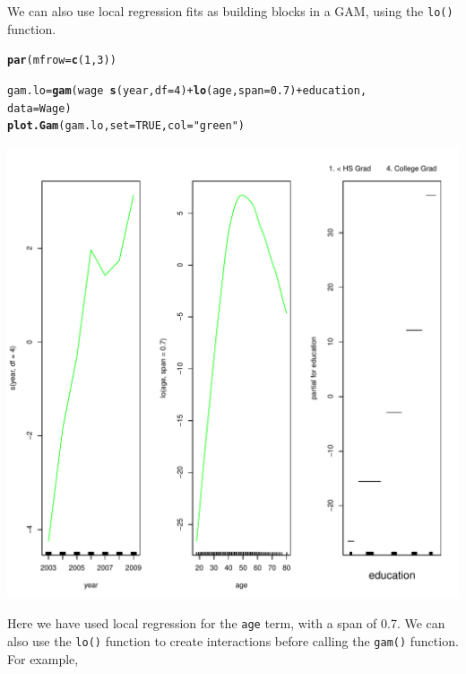 \documentclass[12pt]{article}\usepackage[]{graphicx}\usepackage[]{color}
\makeatletter
\def\maxwidth{ %
  \ifdim\Gin@nat@width>\linewidth
    \linewidth
  \else
    \Gin@nat@width
  \fi
}
\newcommand{\hlnum}[1]{\textcolor[rgb]{0.686,0.059,0.569}{#1}}%
\newcommand{\hlstr}[1]{\textcolor[rgb]{0.192,0.494,0.8}{#1}}%
\newcommand{\hlopt}[1]{\textcolor[rgb]{0,0,0}{#1}}%
\newcommand{\hlstd}[1]{\textcolor[rgb]{0.345,0.345,0.345}{#1}}%
\newcommand{\hlkwb}[1]{\textcolor[rgb]{0.69,0.353,0.396}{#1}}%
\newcommand{\hlkwc}[1]{\textcolor[rgb]{0.333,0.667,0.333}{#1}}%
\newcommand{\hlkwd}[1]{\textcolor[rgb]{0.737,0.353,0.396}{\textbf{#1}}}%
\newenvironment{kframe}{%
 \def\at@end@of@kframe{}%
 \ifinner\ifhmode%
  \def\at@end@of@kframe{\end{minipage}}%
  \begin{minipage}{\columnwidth}%
 \fi\fi%
 \def\FrameCommand##1{\hskip\@totalleftmargin \hskip-\fboxsep
 \colorbox{shadecolor}{##1}\hskip-\fboxsep
     \hskip-\linewidth \hskip-\@totalleftmargin \hskip\columnwidth}%
 \MakeFramed {\advance\hsize-\width
   \@totalleftmargin\z@ \linewidth\hsize
   \@setminipage}}%
 {\par\unskip\endMakeFramed%
 \at@end@of@kframe}
\newenvironment{knitrout}{}{} %
\makeatother
\begin{document}
We can also use local regression fits as building blocks in a GAM, using the \texttt{lo()} function.

\begin{knitrout}
\color{fgcolor}\begin{kframe}
\begin{alltt}
\hlkwd{par}\hlstd{(}\hlkwc{mfrow}\hlstd{=}\hlkwd{c}\hlstd{(}\hlnum{1}\hlstd{,}\hlnum{3}\hlstd{))}

\hlstd{gam.lo} \hlkwb{=} \hlkwd{gam}\hlstd{(wage}\hlopt{~}\hlkwd{s}\hlstd{(year,} \hlkwc{df} \hlstd{=}\hlnum{4}\hlstd{)}\hlopt{+} \hlkwd{lo}\hlstd{(age,} \hlkwc{span}\hlstd{=}\hlnum{0.7}\hlstd{)} \hlopt{+} \hlstd{education,}
             \hlkwc{data}\hlstd{=Wage)}
\hlkwd{plot.Gam}\hlstd{(gam.lo,} \hlkwc{set}\hlstd{=}\hlnum{TRUE}\hlstd{,} \hlkwc{col}\hlstd{=}\hlstr{"green"}\hlstd{)}
\end{alltt}
\end{kframe}
\includegraphics[width=\maxwidth]{figure/unnamed-chunk-30-1} 

\end{knitrout}

Here we have used local regression for the \texttt{age} term, with a span of 0.7. We can also use the \texttt{lo()} function to create interactions before calling the \texttt{gam()} function. For example,
\end{document}
